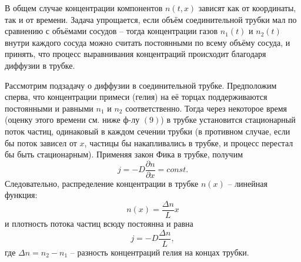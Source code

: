 \documentclass[a4paper,12pt]{article}
\begin{document}
В общем случае концентрации компонентов $n(t, x)$ зависят как от координаты, так и от времени. Задача упрощается, если объём соединительной трубки мал по сравнению с объёмами сосудов -- тогда концентрации газов $n_1(t)$ и $n_2(t)$ внутри каждого сосуда можно считать постоянными по всему объёму сосуда, и принять, что процесс выравнивания концентраций происходит благодаря диффузии в трубке.

Рассмотрим подзадачу о диффузии в соединительной трубке. Предположим сперва, что концентрации примеси (гелия) на её торцах поддерживаются постоянными и равными $n_1$ и $n_2$ соответственно. Тогда через некоторое время (оценку этого времени см. ниже ф-лу $(9)$) в трубке установится стационарный поток частиц, одинаковый в каждом сечении трубки (в противном случае, если бы поток зависел от $x$, частицы бы накапливались в трубке, и процесс перестал бы быть стационарным). Применяя закон Фика в трубке, получим $$j = -D \dfrac{\partial n}{\partial x} = const.$$
Следовательно, распределение концентрации в трубке $n(x)$ -- линейная функция:
\begin{equation}
	n(x) = \dfrac{\Delta n}{L} x
\end{equation}
и плотность потока частиц всюду постоянна и равна
\begin{equation}
	j = -D \dfrac{\Delta n}{L},
\end{equation}
где $\Delta n = n_2 - n_1$ -- разность концентраций гелия на концах трубки.
\end{document}

